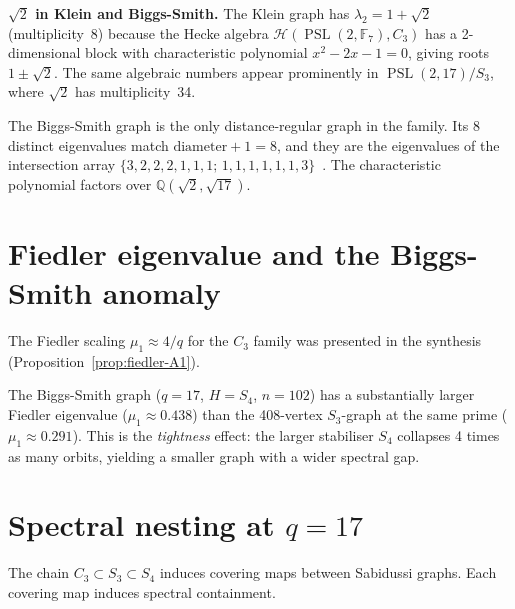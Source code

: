 \documentclass[11pt,a4paper]{article}
\theoremstyle{plain}
\theoremstyle{definition}
\theoremstyle{remark}
\newcommand{\Q}{\mathbb{Q}}
\newcommand{\F}{\mathbb{F}}
\newcommand{\PSL}{\operatorname{PSL}}
\begin{document}
\begin{tcolorbox}[colback=yellow!10, colframe=yellow!10,
  boxrule=0pt, sharp corners]
\textbf{$\sqrt{2}$ in Klein and Biggs-Smith.}
The Klein graph has $\lambda_2 = 1+\sqrt{2}$ (multiplicity~8) because the
Hecke algebra $\mathcal{H}(\PSL(2,\F_7), C_3)$ has a 2-dimensional block
with characteristic polynomial $x^2 - 2x - 1 = 0$, giving roots $1\pm\sqrt{2}$.
The same algebraic numbers appear prominently in $\PSL(2,17)/S_3$, where
$\sqrt{2}$ has multiplicity~34.
\end{tcolorbox}

The Biggs-Smith graph is the only distance-regular graph in the family.
Its 8 distinct eigenvalues match $\text{diameter} + 1 = 8$, and they are
the eigenvalues of the intersection array
$\{3,2,2,2,1,1,1;\, 1,1,1,1,1,1,3\}$~\cite{BCN}. The characteristic
polynomial factors over $\Q(\sqrt{2}, \sqrt{17})$.


\section{Fiedler eigenvalue and the Biggs-Smith anomaly}

\begin{tcolorbox}[colback=black!5, colframe=black!5,
  boxrule=0pt, sharp corners]
The Fiedler scaling $\mu_1 \approx 4/q$ for the $C_3$ family was
presented in the synthesis (Proposition~\ref{prop:fiedler-A1}).

The Biggs-Smith graph ($q=17$, $H=S_4$, $n=102$) has a substantially
larger Fiedler eigenvalue ($\mu_1 \approx 0.438$) than the 408-vertex
$S_3$-graph at the same prime ($\mu_1 \approx 0.291$). This is the
\emph{tightness} effect: the larger stabiliser $S_4$ collapses 4 times
as many orbits, yielding a smaller graph with a wider spectral gap.
\end{tcolorbox}


\section{Spectral nesting at $q = 17$}
\label{sec:nesting-psl}

The chain $C_3 \subset S_3 \subset S_4$ induces covering maps between
Sabidussi graphs. Each covering map induces spectral containment.
\end{document}
